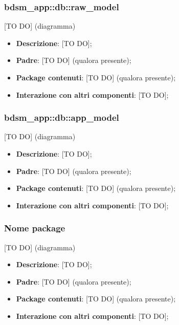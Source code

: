 
  \subsubsection{bdsm\_app::db::raw_model} %
  \label{ssub:bdsm_app_raw_model}
  [TO DO] (diagramma) \newline \newline

  \begin{itemize}
    \item \textbf{Descrizione}: [TO DO];
    \item \textbf{Padre}: [TO DO] (qualora presente);
    \item \textbf{Package contenuti}: [TO DO] (qualora presente);
    \item \textbf{Interazione con altri componenti}: [TO DO];
  \end{itemize}

  \subsubsection{bdsm\_app::db::app_model} %
  \label{ssub:bdsm_app_app_model}
  [TO DO] (diagramma) \newline \newline

  \begin{itemize}
    \item \textbf{Descrizione}: [TO DO];
    \item \textbf{Padre}: [TO DO] (qualora presente);
    \item \textbf{Package contenuti}: [TO DO] (qualora presente);
    \item \textbf{Interazione con altri componenti}: [TO DO];
  \end{itemize}



  \subsubsection{Nome package} %
  \label{ssub:nome_del_package}
  [TO DO] (diagramma) \newline \newline

  \begin{itemize}
    \item \textbf{Descrizione}: [TO DO];
    \item \textbf{Padre}: [TO DO] (qualora presente);
    \item \textbf{Package contenuti}: [TO DO] (qualora presente);
    \item \textbf{Interazione con altri componenti}: [TO DO];
  \end{itemize}

